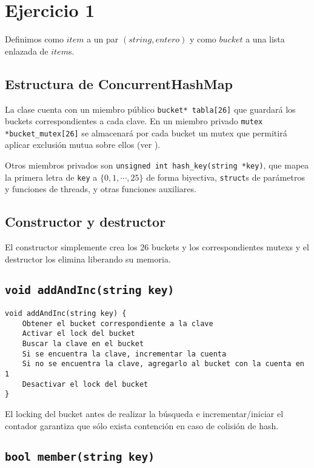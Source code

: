 \section{Ejercicio 1}

Definimos como $item$ a un par $(string, entero)$ y como $bucket$ a una lista enlazada de $item$s.


\subsection{Estructura de ConcurrentHashMap}

La clase cuenta con un miembro público \texttt{bucket* tabla[26]} que guardará los buckets correspondientes a cada clave. En un miembro privado \texttt{mutex *bucket_mutex[26]} se almacenará por cada bucket un mutex que permitirá aplicar exclusión mutua sobre ellos (ver \cite{cppref-mutex}).

Otros miembros privados son \texttt{unsigned int hash_key(string *key)}, que mapea la primera letra de \texttt{key} a $\{ 0, 1, \cdots, 25 \}$ de forma biyectiva, \texttt{struct}s de parámetros y funciones de threads, y otras funciones auxiliares.


\subsection{Constructor y destructor}

El constructor simplemente crea los 26 buckets y los correspondientes mutexs y el destructor los elimina liberando su memoria.


\subsection{\texttt{void addAndInc(string key)}}

\begin{verbatim}
void addAndInc(string key) {
	Obtener el bucket correspondiente a la clave
	Activar el lock del bucket
	Buscar la clave en el bucket
	Si se encuentra la clave, incrementar la cuenta
	Si no se encuentra la clave, agregarlo al bucket con la cuenta en 1
	Desactivar el lock del bucket
}
\end{verbatim}

El locking del bucket antes de realizar la búsqueda e incrementar/iniciar el contador garantiza que sólo exista contención en caso de colisión de hash.


\subsection{\texttt{bool member(string key)}}


